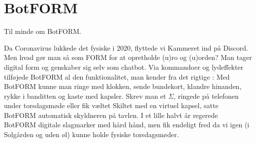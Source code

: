 \section{BotFORM}

Til minde om BotFORM.

Da Coronavirus lukkede det fysiske \TK i 2020, flyttede vi Kammeret ind på Discord. Men hvad gør man så som FORM for at opretholde (u)ro og (u)orden? Man tager digital form og genskaber sig selv som chatbot. Via kommandoer og lydeffekter tilføjede BotFORM al den funktionalitet, man kender fra det rigtige \TKET: Med BotFORM kunne man ringe med klokken, sende bundekort, klandre hinanden, rykke i banditten og kaste med kapsler. Skrev man et $\Sigma$, ringede på telefonen under torsdagsmøde eller fik væltet Skiltet med en virtuel kapsel, satte BotFORM automatisk skyldneren på tavlen. I et lille halvt år regerede BotFORM \TKETs digitale slagmarker med hård hånd, men fik endeligt fred da vi igen (i Solgården og uden øl) kunne holde fysiske torsdagsmøder.
%

